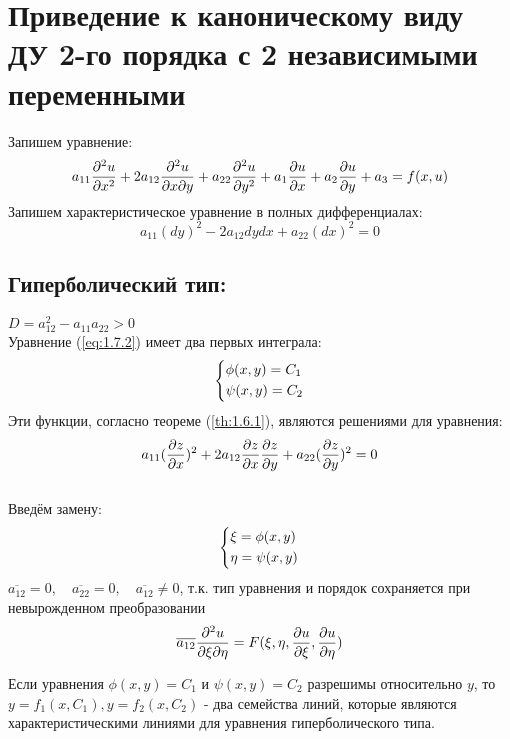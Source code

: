 \documentclass[../main.tex]{subfiles}
\begin{document}
\section{Приведение к каноническому виду ДУ 2-го порядка с 2 независимыми переменными}

Запишем уравнение:
\begin{equation}\label{eq:1.7.1}
	a_{11}\frac{\partial^2u}{\partial x^2} + 2a_{12}\frac{\partial^2u}{\partial x \partial y} + a_{22}\frac{\partial^2u}{\partial y^2} + a_1\frac{\partial u}{\partial x} +a_2\frac{\partial u}{\partial y}+a_3 = f(x,u)
\end{equation}
Запишем характеристическое уравнение в полных дифференциалах:
\begin{equation}
	\label{eq:1.7.2}
	a_{11}(dy)^2 - 2a_{12}dydx + a_{22}(dx)^2 = 0
\end{equation}

\subsection*{Гиперболический тип: }
$D = a_{12}^2 - a_{11}a_{22} > 0$
\\
Уравнение (\ref*{eq:1.7.2}) имеет два первых интеграла:
$$\begin{dcases}\phi(x,y) = C_1 \\ \psi(x,y) = C_2\end{dcases}$$
Эти функции, согласно теореме (\ref{th:1.6.1}), являются решениями для уравнения:
\begin{equation}\label{eq:1.7.3}
	a_{11}(\frac{\partial z}{\partial x})^2 + 2a_{12}\frac{\partial z}{\partial x}\frac{\partial z}{\partial y} + a_{22}(\frac{\partial z}{\partial y})^2 = 0
\end{equation}
\\
Введём замену:
$$\begin{dcases}\xi = \phi(x,y) \\ \eta = \psi(x,y) \end{dcases}$$
$\overline{a_{12}} = 0, \quad \overline{a_{22}}=0, \quad \overline{a_{12}}\neq0$, т.к. тип уравнения и порядок сохраняется при невырожденном преобразовании\\
$$\overline{a_{12}}\frac{\partial^2u}{\partial\xi\partial\eta}=F(\xi, \eta, \frac{\partial u}{\partial \xi}, \frac{\partial u}{\partial \eta})$$

\par Если уравнения $\phi(x,y) = C_1$ и $\psi(x,y)=C_2$ разрешимы относительно $y$, то $y=f_1(x, C_1), y=f_2(x, C_2)$ - два семейства линий, которые являются характеристическими линиями для уравнения гиперболического типа. \\
\end{document}
